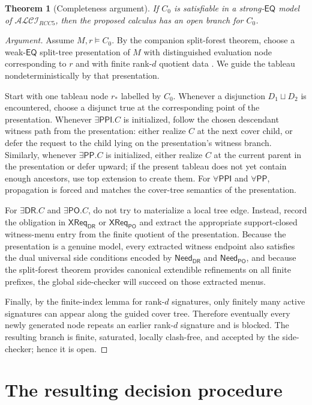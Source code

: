 \documentclass[11pt]{article}
\newtheorem{theorem}[definition]{Theorem}
\theoremstyle{remark}
\newcommand{\DR}{\mathsf{DR}}
\newcommand{\PO}{\mathsf{PO}}
\newcommand{\PP}{\mathsf{PP}}
\newcommand{\PPI}{\mathsf{PPI}}
\newcommand{\EQ}{\mathsf{EQ}}
\newcommand{\CrossDR}{\mathsf{XReq}_{\DR}}
\newcommand{\CrossPO}{\mathsf{XReq}_{\PO}}
\newcommand{\NeedDR}{\mathsf{Need}_{\DR}}
\newcommand{\NeedPO}{\mathsf{Need}_{\PO}}
\begin{document}
\begin{theorem}[Completeness argument]\label{thm:completeness}
If $C_0$ is satisfiable in a strong-$\EQ$ model of $\mathcal{ALCI}_{RCC5}$, then the proposed calculus has an open branch for $C_0$.
\end{theorem}

\begin{proof}[Argument]
Assume $M,r\models C_0$. By the companion split-forest theorem, choose a weak-$\EQ$ split-tree presentation of $M$ with distinguished evaluation node corresponding to $r$ and with finite rank-$d$ quotient data \cite{SiblingCompleted}. We guide the tableau nondeterministically by that presentation.

Start with one tableau node $r_\ast$ labelled by $C_0$. Whenever a disjunction $D_1\sqcup D_2$ is encountered, choose a disjunct true at the corresponding point of the presentation. Whenever $\exists\PPI.C$ is initialized, follow the chosen descendant witness path from the presentation: either realize $C$ at the next cover child, or defer the request to the child lying on the presentation's witness branch. Similarly, whenever $\exists\PP.C$ is initialized, either realize $C$ at the current parent in the presentation or defer upward; if the present tableau does not yet contain enough ancestors, use top extension to create them. For $\forall\PPI$ and $\forall\PP$, propagation is forced and matches the cover-tree semantics of the presentation.

For $\exists\DR.C$ and $\exists\PO.C$, do not try to materialize a local tree edge. Instead, record the obligation in $\CrossDR$ or $\CrossPO$ and extract the appropriate support-closed witness-menu entry from the finite quotient of the presentation. Because the presentation is a genuine model, every extracted witness endpoint also satisfies the dual universal side conditions encoded by $\NeedDR$ and $\NeedPO$, and because the split-forest theorem provides canonical extendible refinements on all finite prefixes, the global side-checker will succeed on those extracted menus.

Finally, by the finite-index lemma for rank-$d$ signatures, only finitely many active signatures can appear along the guided cover tree. Therefore eventually every newly generated node repeats an earlier rank-$d$ signature and is blocked. The resulting branch is finite, saturated, locally clash-free, and accepted by the side-checker; hence it is open.
\end{proof}

\section{The resulting decision procedure}
\end{document}
